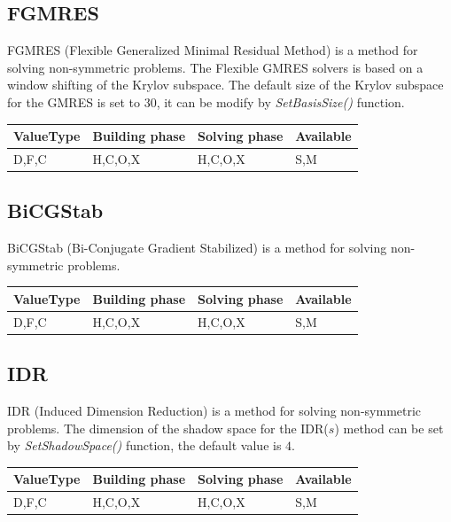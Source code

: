 \subsection{FGMRES}

FGMRES (Flexible Generalized Minimal Residual Method) is a method for solving non-symmetric problems. The Flexible GMRES solvers is based on a window shifting of the Krylov subspace. The default size of the Krylov subspace for the GMRES is set to 30, it can be modify by \emph{SetBasisSize()} function.


\begin{table}[H]
\begin{tabular}{l|l|l|l}
\multicolumn{1}{c|}{ValueType} & Building phase & Solving phase & Available \\ \hline
D,F,C                          & H,C,O,X        & H,C,O,X       & S,M      
\end{tabular}
\end{table}




\subsection{BiCGStab}

BiCGStab (Bi-Conjugate Gradient Stabilized) is a method for solving non-symmetric problems.

\begin{table}[H]
\begin{tabular}{l|l|l|l}
\multicolumn{1}{c|}{ValueType} & Building phase & Solving phase & Available \\ \hline
D,F,C                          & H,C,O,X        & H,C,O,X       & S,M      
\end{tabular}
\end{table}





\subsection{IDR}

IDR (Induced Dimension Reduction) is a method for solving non-symmetric problems. The dimension of the shadow space for the IDR($s$) method can be set by \emph{SetShadowSpace()} function, the default value is $4$.

\begin{table}[H]
\begin{tabular}{l|l|l|l}
\multicolumn{1}{c|}{ValueType} & Building phase & Solving phase & Available \\ \hline
D,F,C                          & H,C,O,X        & H,C,O,X       & S,M      
\end{tabular}
\end{table}


